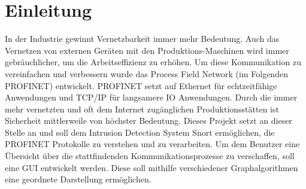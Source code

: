 \chapter*{Einleitung}

In der Industrie gewinnt Vernetzbarkeit immer mehr Bedeutung. Auch das Vernetzen von externen Geräten mit den Produktions-Maschinen wird immer gebräuchlicher, um die Arbeitseffizienz zu erhöhen. Um diese Kommunikation zu vereinfachen und verbessern wurde das Process Field Network (im Folgenden PROFINET) entwickelt. PROFINET setzt auf Ethernet für echtzeitfähige Anwendungen und TCP/IP für langsamere IO Anwendungen. Durch die immer mehr vernetzten und oft dem Internet zugänglichen Produktionsstätten ist Sicherheit mittlerweile von höchster Bedeutung. Dieses Projekt setzt an dieser Stelle an und soll dem Intrusion Detection System Snort ermöglichen, die PROFINET Protokolle zu verstehen und zu verarbeiten. Um dem Benutzer eine Übersicht über die stattfindenden Kommunikationsprozesse zu verschaffen, soll eine GUI entwickelt werden. Diese soll mithilfe verschiedener Graphalgorithmen eine geordnete Darstellung ermöglichen. 